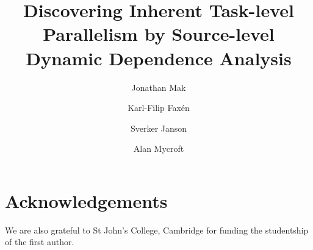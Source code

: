 \documentclass{llncs}
\begin{document}
\title{Discovering Inherent Task-level Parallelism by Source-level Dynamic Dependence Analysis}

\author{Jonathan Mak
   \and Karl-Filip Fax\'en
   \and Sverker Janson
   \and Alan Mycroft
}

          
\maketitle 





\section*{Acknowledgements}

We are also grateful to St John's College, Cambridge for funding the studentship of the first author.


{}
\end{document}
